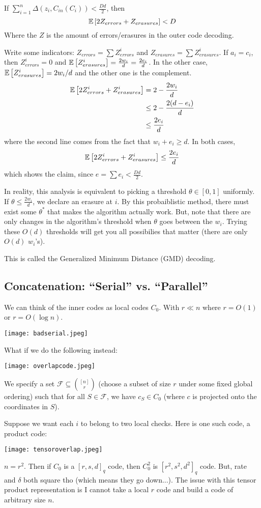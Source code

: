 \begin{theorem}
    If $\sum_{i = 1}^n \Delta(z_i, C_{in}(C_i)) < \frac{Dd}{2}$, then
    \[ \mathbb{E}\left[ 2Z_{errors} + Z_{erasures} \right] < D \]
    Where the $Z$ is the amount of errors/erasures in the outer code decoding.
    \begin{proof*}
        Write some indicators: $Z_{errors} = \sum Z_{errors}^i$ and $Z_{erasures} = \sum Z_{erasures}^i$.
        If $a_i = c_i$, then $Z_{errors}^i = 0$ and $\mathbb{E}\left[ Z_{erasures}^{i} \right] = \frac{2w_i}{d} = \frac{2e_i}{d}$.
        In the other case, $\mathbb{E}\left[ Z_{erasures}^i \right] = 2w_i/d$ and the other one is the complement.
        \begin{align*}
            \mathbb{E}\left[ 2 Z_{errors}^i + Z_{erasures}^i \right] &= 2 - \frac{2w_i}{d} \\
            &\leq 2 - \frac{2(d - e_i)}{d} \\
            &\leq \frac{2e_i}{d}
        \end{align*}
        where the second line comes from the fact that $w_i + e_i \geq d$.
        In both cases,
        \[ \mathbb{E}\left[ 2 Z_{errors}^i + Z_{erasures}^i \right] \leq \frac{2e_i}{d} \]
        which shows the claim, since $e = \sum e_i < \frac{Dd}{2}$.
    \end{proof*}
\end{theorem}

In reality, this analysis is equivalent to picking a threshold $\theta \in [0, 1]$ uniformly.
If $\theta \leq \frac{2w_i}{d}$, we declare an erasure at $i$. By this probaiblistic method,
there must exist some $\theta^*$ that makes the algorithm actually work. But, note that there are only changes in the algorithm's threshold
when $\theta$ goes between the $w_i$. Trying these $O(d)$ thresholds will get you all possibilies that matter (there are only $O(d)$ $w_i$'s).

This is called the Generalized Minimum Distance (GMD) decoding.
\subsection{Concatenation: ``Serial'' vs. ``Parallel''}
We can think of the inner codes as local codes $C_0$. With $r \ll n$ where $r = O(1)$ or $r = O(\log n)$.

\texttt{[image: badserial.jpeg]}

What if we do the following instead:

\texttt{[image: overlapcode.jpeg]}

We specify a set $\mathcal{F} \subseteq \binom{[n]}{r}$ (choose a subset of size $r$ under some fixed global ordering)
such that for all $S \in \mathcal{F}$, we have $c_S \in C_0$ (where $c$ is projected onto the coordinates in $S$).

Suppose we want each $i$ to belong to two local checks. Here is one such code, a product code:

\texttt{[image: tensoroverlap.jpeg]}

$n = r^2$. Then if $C_0$ is a $[r, s, d]_q$ code, then $C_0^2$ is $[r^2, s^2, d^2]_q$ code. But, rate and $\delta$ both square tho (which means they go down...).
The issue with this tensor product representation is I cannot take a local $r$ code and build a code of arbitrary size $n$.
